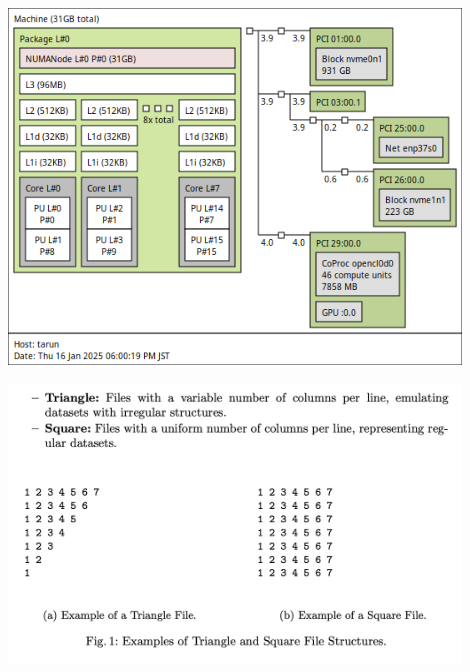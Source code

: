 \documentclass{beamer}
\begin{document}
\begin{frame}
\includegraphics[width=0.9\textwidth]{topo.png}
\end{frame}

\begin{frame}
\includegraphics[width=0.9\textwidth]{image.png}
\end{frame}



\end{document}
